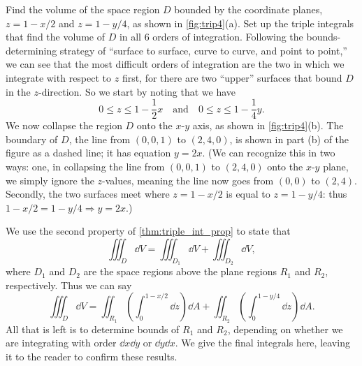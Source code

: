 \begin{example}\label{ex_trip4}%
Find the volume of the space region $D$ bounded by the coordinate planes, $z=1-x/2$ and $z=1-y/4$, as shown in \autoref{fig:trip4}(a). Set up the triple integrals that find the volume of $D$ in all 6 orders of integration.
\solution
Following the bounds-determining strategy of ``surface to surface, curve to curve, and point to point,''  we can see that the most difficult orders of integration are the two in which we integrate with respect to $z$ first, for there are two ``upper'' surfaces that bound $D$ in the $z$-direction. So we start by noting that we have 
\[0\leq z\leq 1-\frac12x \quad\text{and}\quad 0\leq z\leq 1-\frac14y.\]
We now collapse the region $D$ onto the $x$-$y$ axis, as shown in \autoref{fig:trip4}(b). The boundary of $D$, the line from $(0,0,1)$ to $(2,4,0)$, is shown in part (b) of the figure as a dashed line; it has equation $y=2x$. (We can recognize this in two ways: one, in collapsing the line from $(0,0,1)$ to $(2,4,0)$ onto the $x$-$y$ plane, we simply ignore the $z$-values, meaning the line now goes from $(0,0)$ to $(2,4)$. Secondly, the two surfaces meet where $z=1-x/2$ is equal to $z=1-y/4$: thus $1-x/2=1-y/4 \Rightarrow y=2x.$)

We use the second property of \autoref{thm:triple_int_prop} to state that 
\[\iiint_D \dd V = \iiint_{D_1}\dd V + \iiint_{D_2}\dd V,\]
where $D_1$ and $D_2$ are the space regions above the plane regions $R_1$ and $R_2$, respectively. Thus we can say
\[
\iiint_D\dd V
= \iint_{R_1}\left(\int_0^{1-x/2}\dd z\right)\dd A + \iint_{R_2}\left(\int_0^{1-y/4}\dd z\right)\dd A.
\]
All that is left is to determine bounds of $R_1$ and $R_2$, depending on whether we are integrating with order $\dd x\dd y$ or $\dd y\dd x$. We give the final integrals here, leaving it to the reader to confirm these results.\bigskip


\end{example}
